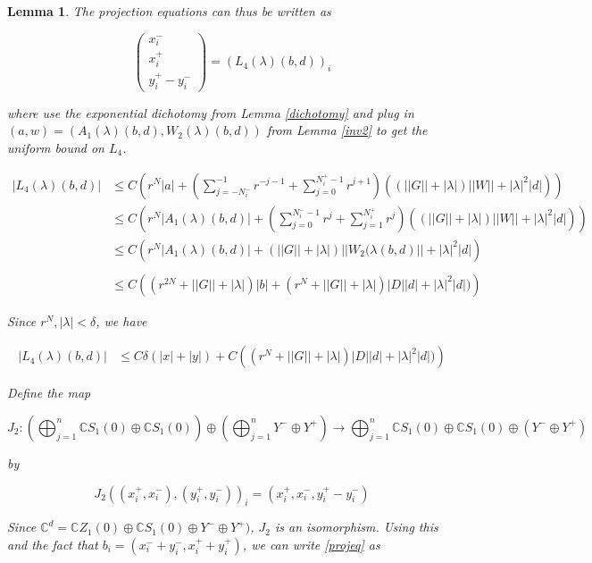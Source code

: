 \documentclass[12pt]{article}
\def\C{{\mathbb C}}
\newtheorem{lemma}{Lemma}
\begin{document}
\begin{lemma}
The projection equations can thus be written as

\begin{equation}\label{projeq}
\begin{pmatrix}
x_i^- \\ x_i^+ \\ y_i^+ - y_i^-
\end{pmatrix}
= (L_4(\lambda)(b,d))_i
\end{equation}

where use the exponential dichotomy from Lemma \ref{dichotomy} and plug in $(a, w) = (A_1(\lambda)(b,d), W_2(\lambda)(b,d))$ from Lemma \ref{inv2} to get the uniform bound on $L_4$.

\begin{align*}
|L_4(\lambda)(b,d)| 
&\leq C \left( r^N |a| + \left(\sum_{j = -N_i^-}^{-1} r^{-j-1} + \sum_{j = 0}^{N_i^+ - 1} r^{j+1} \right)((||G|| + |\lambda|)||W|| + |\lambda|^2 |d|) \right) \\
&\leq C \left( r^N |A_1(\lambda)(b,d)| + \left(\sum_{j = 0}^{N_i^- -1} r^j + \sum_{j = 1}^{N_i^+} r^j \right)((||G|| + |\lambda|)||W|| + |\lambda|^2 |d|) \right) \\
&\leq C \left( r^N |A_1(\lambda)(b,d)| + (||G|| + |\lambda|)||W_2(\lambda(b,d)|| + |\lambda|^2 |d| \right) \\ \\
&\leq C \left( (r^{2N} + ||G|| + |\lambda|)|b| + 
(r^{N} + ||G|| + |\lambda|)|D| |d| + |\lambda|^2 |d| )
\right)
\end{align*}

Since $r^N, |\lambda| < \delta$, we have

\begin{align*}
|L_4(\lambda)(b,d)| &\leq C \delta(|x| + |y|) + C \left( (r^{N} + ||G|| + |\lambda|)|D| |d| + |\lambda|^2 |d| )
\right)
\end{align*}

Define the map

\[
J_2: \left( \bigoplus_{j=1}^n \C S_1(0) \oplus \C S_1(0) \right) \oplus
\left( \bigoplus_{j=1}^n Y^- \oplus Y^+ \right) 
\rightarrow \bigoplus_{j=1}^n \C S_1(0) \oplus \C S_1(0) \oplus (Y^- \oplus Y^+)
\]

by 

\[
J_2( (x_i^+, x_i^-),(y_i^+, y_i^-))_i = ( x_i^+, x_i^-, y_i^+ - y_i^- )
\]

Since $\C^d = \C Z_1(0) \oplus \C S_1(0) \oplus Y^- \oplus Y^+)$, $J_2$ is an isomorphism. Using this and the fact that $b_i = (x_i^- + y_i^-, x_i^+ + y_i^+)$, we can write \eqref{projeq} as


\end{lemma}
\end{document}
